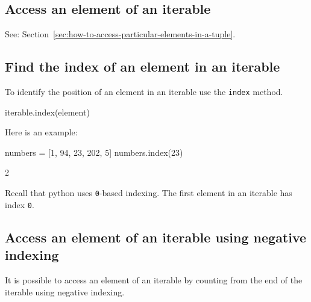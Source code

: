 \begin{raw}
[1, 6, 10, 20, 50, 50, 105]
\end{raw}





\subsection{Access an element of an iterable}
\label{\detokenize{building-tools/02-functions-and-data-structures/how/main:access-an-element-of-an-iterable}}

See: Section~\ref{sec:how-to-access-particular-elements-in-a-tuple}.


\subsection{Find the index of an element in an iterable}

To identify the position of an element in an iterable use the \texttt{index} method.


\begin{pyin}
iterable.index(element)
\end{pyin}



Here is an example:




\begin{pyin}
numbers = [1, 94, 23, 202, 5]
numbers.index(23)
\end{pyin}





\begin{raw}
2
\end{raw}


\begin{note}
Recall that python uses \texttt{0}-based indexing. The first element in an iterable has
index \texttt{0}.
\end{note}



\subsection{Access an element of an iterable using negative indexing}
\label{sec:access_an_element_of_an_iterable_using_negative_indexing}

It is possible to access an element of an iterable by counting from the end of
the iterable using negative indexing.


